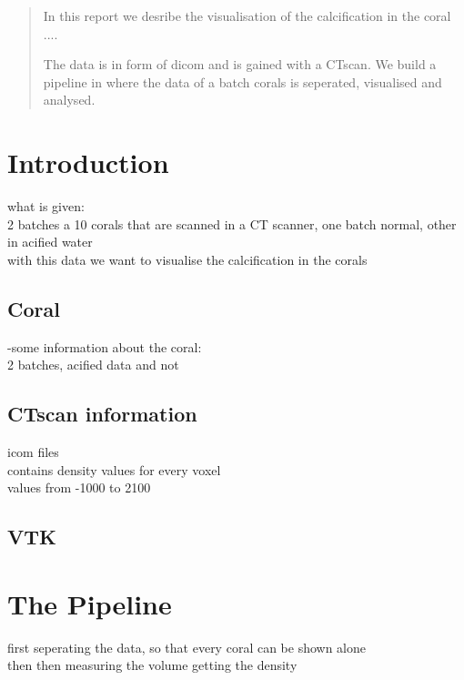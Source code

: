 \documentclass[12pt]{article}
\author{Kristin Rieping (10252428) \and Toby \and Mihai \and Robrecht}
\date{today}
\begin{document}
\maketitle

\begin{abstract}
In this report we desribe the visualisation of the calcification in the coral .... 

The data is in form of dicom and is gained with a CTscan. We build a pipeline in where the data of a batch corals is seperated, visualised and analysed.
\end{abstract}

\section{Introduction}
what is given:\\
2 batches a 10 corals that are scanned in a CT scanner, one batch normal, other in acified water\\
with this data we want to visualise the calcification in the corals\\


\subsection{Coral}
-some information about the coral:\\
2 batches, acified data and not

\subsection{CTscan information}
icom files\\
contains density values for every voxel\\
values from -1000 to 2100\\


\subsection{VTK}


\section{The Pipeline}
first seperating the data, so that every coral can be shown alone\\
then then measuring the volume
getting the density 
\end{document}

